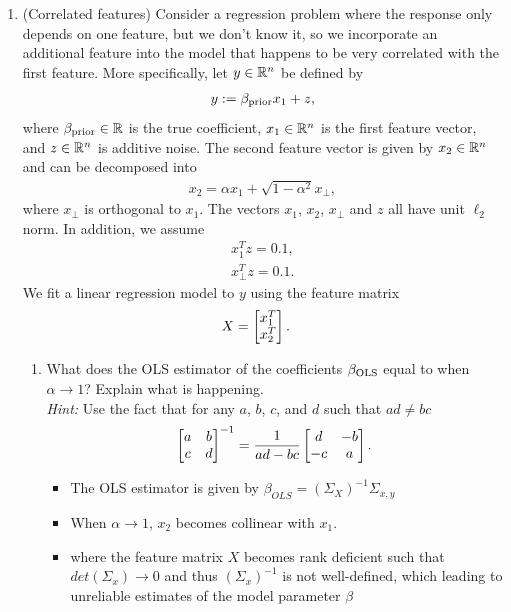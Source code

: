 \documentclass[12pt,twoside]{article}
\begin{document}
\begin{enumerate}
\item  (Correlated features) Consider a regression problem where the response only depends on one feature, but we don't know it, so we incorporate an additional feature into the model that happens to be very correlated with the first feature. More specifically, let $y \in \mathbb{R}^{n}$ be defined by
\begin{align}
y := \beta_{\operatorname{prior}} x_1 + z, 
\end{align}
where $\beta_{\operatorname{prior}} \in \mathbb{R}$ is the true coefficient, $x_1 \in \mathbb{R}^n$ is the first feature vector, and $z \in \mathbb{R}^{n}$ is additive noise. The second feature vector is given by $x_2\in \mathbb{R}^n$ and can be decomposed into
\begin{align}
x_2 = \alpha x_1 + \sqrt{1-\alpha^2} x_{\perp},
\end{align}  
where $x_{\perp}$ is orthogonal to $x_1$. The vectors $x_1$, $x_2$, $x_{\perp}$ and $z$ all have unit $\ell_2$ norm. In addition, we assume
\begin{align}
x_1^Tz = 0.1, \\
x_{\perp}^Tz = 0.1.
\end{align}
We fit a linear regression model to $y$ using the feature matrix 
  \begin{align}
  X & = \begin{bmatrix} x_1^T \\ x_2^T \end{bmatrix}.
  \end{align} 
 \begin{enumerate}
  \item What does the OLS estimator of the coefficients $\beta_{\operatorname{OLS}}$ equal to when $\alpha \rightarrow 1$? Explain what is happening. \\
\emph{Hint:} Use the fact that for any $a$, $b$, $c$, and $d$ such that $ad \neq bc$
\begin{align}
 \begin{bmatrix} a & b \\ c & d \end{bmatrix}^{-1} = \frac{1}{ad-bc} \begin{bmatrix} d & -b \\ -c & a \end{bmatrix}.
\end{align}
\begin{itemize}
\color{red}
    \item The OLS estimator is given by $\beta_{OLS} = (\Sigma_{X})^{-1} \Sigma_{x,y}$
    \item When $\alpha \rightarrow 1$, $x_2$ becomes collinear with $x_1$. 
    \item where the feature matrix $X$ becomes rank deficient such that $det(\Sigma_{x}) \rightarrow 0$ and thus $(\Sigma_{x})^{-1}$ is not well-defined, which leading to unreliable estimates of the model parameter $\beta$

\end{itemize}
\end{enumerate}
\end{enumerate}
\end{document}
